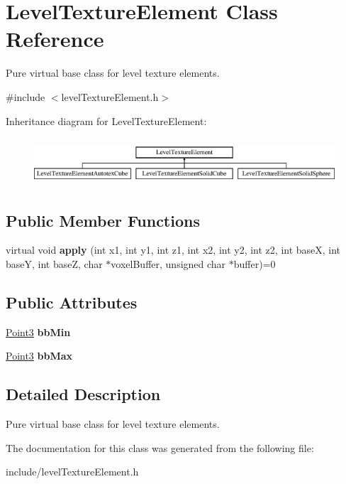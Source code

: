 \hypertarget{classLevelTextureElement}{
\section{\-Level\-Texture\-Element \-Class \-Reference}
\label{de/d9a/classLevelTextureElement}
}


\-Pure virtual base class for level texture elements.  




{\ttfamily \#include $<$level\-Texture\-Element.\-h$>$}

\-Inheritance diagram for \-Level\-Texture\-Element\-:\begin{figure}[H]
\begin{center}
\leavevmode
\includegraphics[height=1.786284cm]{de/d9a/classLevelTextureElement}
\end{center}
\end{figure}
\subsection*{\-Public \-Member \-Functions}
\begin{DoxyCompactItemize}
\item 
\hypertarget{classLevelTextureElement_aed2206a5c081902db791025b6f66830c}{
virtual void {\bfseries apply} (int x1, int y1, int z1, int x2, int y2, int z2, int base\-X, int base\-Y, int base\-Z, char $\ast$voxel\-Buffer, unsigned char $\ast$buffer)=0}
\label{de/d9a/classLevelTextureElement_aed2206a5c081902db791025b6f66830c}

\end{DoxyCompactItemize}
\subsection*{\-Public \-Attributes}
\begin{DoxyCompactItemize}
\item 
\hypertarget{classLevelTextureElement_ac51efce06175ed7a601da9f7883faac4}{
\hyperlink{classPoint3}{\-Point3} {\bfseries bb\-Min}}
\label{de/d9a/classLevelTextureElement_ac51efce06175ed7a601da9f7883faac4}

\item 
\hypertarget{classLevelTextureElement_a99286349bd25991baa3f900c90e0c232}{
\hyperlink{classPoint3}{\-Point3} {\bfseries bb\-Max}}
\label{de/d9a/classLevelTextureElement_a99286349bd25991baa3f900c90e0c232}

\end{DoxyCompactItemize}


\subsection{\-Detailed \-Description}
\-Pure virtual base class for level texture elements. 

\-The documentation for this class was generated from the following file\-:\begin{DoxyCompactItemize}
\item 
include/level\-Texture\-Element.\-h\end{DoxyCompactItemize}

